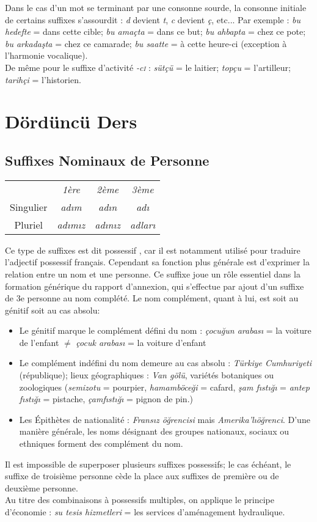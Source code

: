 \documentclass{cours}
\newcommand{\ch}{\c{s}}
\newcommand{\ug}{\u{g}}
\newcommand{\sci}{\textsc{i}}
\begin{document}
Dans le cas d'un mot se terminant par une consonne sourde, la consonne initiale de certains suffixes s'assourdit : {\it d} devient {\it t}, {\it c} devient {\it ç}, etc...
Par exemple : \textit{bu hedefte} = dans cette cible; \textit{bu amaçta} = dans ce but; \textit{bu ahbapta} = chez ce pote; \textit{bu arkada\ch ta} = chez ce camarade; \textit{bu saatte} = à cette heure-ci (exception à l'harmonie vocalique).\\
De même pour le suffixe d'activité \textit{-c\sci} : \textit{sütçü} = le laitier; \textit{topçu} = l'artilleur; \textit{tarihçi} = l'historien.

\section{Dördüncü Ders}
\subsection{Suffixes Nominaux de Personne}
\begin{center}
    \begin{tabular}{c>{\it}c>{\it}c>{\it}c}
                  & 1ère       & 2ème       & 3ème    \\
        Singulier & ad\i m     & ad\i n     & ad\i    \\
        Pluriel   & ad\i m\i z & ad\i n\i z & adlar\i
    \end{tabular}
\end{center}
Ce type de suffixes est dit \og possessif \fg, car il est notamment utilisé pour traduire l'adjectif possessif français. Cependant sa fonction plus générale est d'exprimer la relation entre un nom et une personne. Ce suffixe joue un rôle essentiel dans la formation générique du rapport d'annexion, qui s'effectue par ajout d'un suffixe de 3e personne au nom complété. Le nom complément, quant à lui, est soit au génitif soit au cas absolu:
\begin{itemize}
    \item Le génitif marque le complément défini du nom : \textit{çocu\ug un arabas\i} = la voiture de l'enfant $\neq$ \textit{çocuk arabas\i} = la voiture d'enfant
    \item Le complément indéfini du nom demeure au cas absolu : \textit{Türkiye Cumhuriyeti} (république); lieux géographiques : \textit{Van gölü}, variétés botaniques ou zoologiques (\textit{semizotu} = pourpier, \textit{hamamböce\ug i} = cafard, \textit{\ch am f\i st\i \ug \i } = \textit{antep f\i st\i \ug \i} = pistache, \textit{çamf\i st\i \ug \i} = pignon de pin.)
    \item Les Épithètes de nationalité : \textit{Frans\i z ö\ug rencisi} mais \textit{Amerika'l\i ö\ug renci}. D'une manière générale, les noms désignant des groupes nationaux, sociaux ou ethniques forment des complément du nom.
\end{itemize}
Il est impossible de superposer plusieurs suffixes possessifs; le cas échéant, le suffixe de troisième personne cède la place aux suffixes de première ou de deuxième personne. \\
Au titre des combinaisons à possessifs multiples, on applique le principe d'économie : \textit{su tesis hizmetleri} = les services d'aménagement hydraulique.
\end{document}
